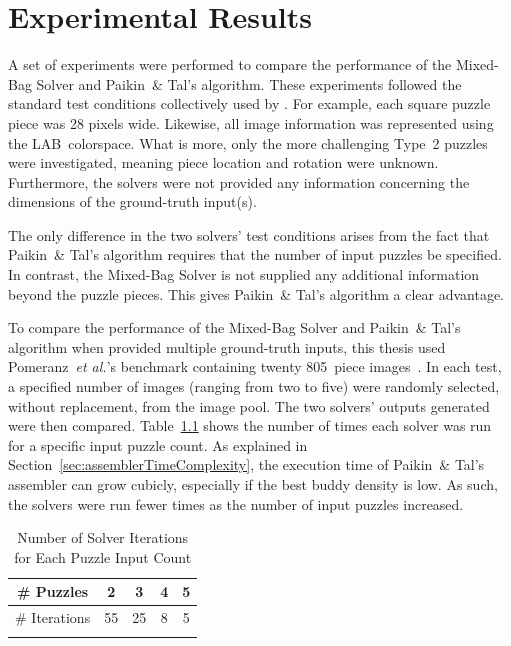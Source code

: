 \chapter{Experimental Results}\label{chap:experimentalResults}

A set of experiments were performed to compare the performance of the Mixed-Bag Solver and Paikin~\& Tal's algorithm.  These experiments followed the standard test conditions collectively used by \cite{cho2010, pomeranz2011, gallagher2012, sholomon2013, paikin2015}.  For example, each square puzzle piece was 28 pixels wide.  Likewise, all image information was represented using the LAB~colorspace.  What is more, only the more challenging Type~2 puzzles were investigated, meaning piece location and rotation were unknown.  Furthermore, the solvers were not provided any information concerning the dimensions of the ground-truth input(s).

The only difference in the two solvers' test conditions arises from the fact that Paikin~\& Tal's algorithm requires that the number of input puzzles be specified. In contrast, the Mixed-Bag Solver is not supplied any additional information beyond the puzzle pieces.  This gives Paikin~\& Tal's algorithm a clear advantage.

To compare the performance of the Mixed-Bag Solver and Paikin~\& Tal's algorithm when provided multiple ground-truth inputs, this thesis used Pomeranz~\textit{et al.}'s benchmark containing twenty 805~piece images~\cite{pomeranzBenchmarkImages}.  In each test, a specified number of images (ranging from two to five) were randomly selected, without replacement, from the image pool.  The two solvers' outputs generated were then compared.  Table~\ref{tab:numberSolverIterations} shows the number of times each solver was run for a specific input puzzle count. As explained in Section~\ref{sec:assemblerTimeComplexity}, the execution time of Paikin~\& Tal's assembler can grow cubicly, especially if the best buddy density is low.  As such, the solvers were run fewer times as the number of input puzzles increased.

\begin{table}[tb]
  \begin{center}
    \begin{tabular}{ |c||c|c|c|c| } 
      \Xhline{1pt}
       \# Puzzles    &  2 &  3 & 4 & 5 \\ 
      \hline \hline
       \# Iterations & 55 & 25 & 8 & 5 \\ 
       \Xhline{1pt}
    \end{tabular}
  \end{center}
\caption{Number of Solver Iterations for Each Puzzle Input Count}\label{tab:numberSolverIterations}
\end{table}

